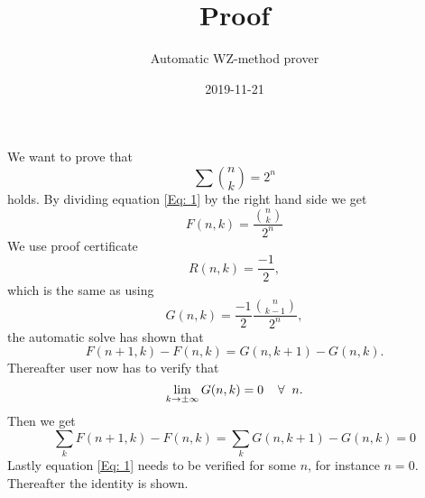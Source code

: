 \documentclass{article}
\title{Proof}
\author{Automatic WZ-method prover}
\date{2019-11-21}
\let\oldforall\forall
\renewcommand{\forall}{\hspace*{2mm}\oldforall\hspace*{1mm}}
\begin{document}
\maketitle
We want to prove that
\begin{equation}\label{Eq: 1}
\sum \binom{n}{k} = 2^n
\end{equation}
holds. By dividing equation \ref{Eq: 1} by the right hand side we get
\begin{equation}
F(n,k)=\frac{\binom{n}{k}}{2^{n}}
\end{equation}
We use proof certificate
\begin{equation}
R(n,k)=\frac{-1}{2},
\end{equation}
which is the same as using
\begin{equation}
G(n,k)=\frac{-1}{2}\frac{\binom{n}{k-1}}{2^{n}},
\end{equation}
the automatic solve has  shown that
\begin{equation}\label{Eq: WZ1}
F(n+1,k)-F(n,k)=G(n,k+1)-G(n,k).
\end{equation}
Thereafter user now has to verify that
\begin{equation}
\lim_{k\to\pm\infty}G(n,k)=0\forall n.
\end{equation}
Then we get
\begin{equation}
\sum_k F(n+1,k)-F(n,k)=\sum_k G(n,k+1)-G(n,k)=0\end{equation}Lastly equation \ref{Eq: 1} needs to be verified for some $n$, for instance $n=0$. Thereafter the identity is shown.
\end{document}

